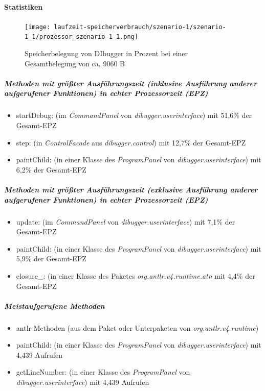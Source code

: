 \documentclass[parskip=full]{scrartcl}
\begin{document}
        \paragraph{Statistiken}
        \begin{figure}[!h]
            \centering
            \texttt{[image: laufzeit-speicherverbrauch/szenario-1/szenario-1\_1/prozessor\_szenario-1-1.png]}
            \caption{Speicherbelegung von DIbugger in Prozent bei einer Gesamtbelegung von ca. 9060 B}
        \end{figure}
        \subparagraph{Methoden mit größter Ausführungszeit (inklusive Ausführung anderer aufgerufener Funktionen) in echter Prozessorzeit (EPZ)}
        \begin{itemize}
            \item{startDebug}: (im \textit{CommandPanel} von \textit{dibugger.userinterface}) mit 51,6\% der Gesamt-EPZ
            \item{step}: (in \textit{ControlFacade} aus \textit{dibugger.control}) mit 12,7\% der Gesamt-EPZ
            \item{paintChild}: (in einer Klasse des \textit{ProgramPanel} von \textit{dibugger.userinterface}) mit 6,2\% der Gesamt-EPZ
        \end{itemize}
        \subparagraph{Methoden mit größter Ausführungszeit (exklusive Ausführung anderer aufgerufener Funktionen) in echter Prozessorzeit (EPZ)}
        \begin{itemize}
            \item{update}: (im \textit{CommandPanel} von \textit{dibugger.userinterface}) mit 7,1\% der Gesamt-EPZ 
            \item{paintChild}: (in einer Klasse des \textit{ProgramPanel} von \textit{dibugger.userinterface}) mit 5,9\% der Gesamt-EPZ
            \item{closure\_}: (in einer Klasse des Paketes \textit{org.antlr.v4.runtime.atn} mit 4,4\% der Gesamt-EPZ
        \end{itemize}
        \subparagraph{Meistaufgerufene Methoden}
        \begin{itemize}
            \item{antlr-Methoden} (aus dem Paket oder Unterpaketen von \textit{org.antlr.v4.runtime}) 
            \item{paintChild}: (in einer Klasse des \textit{ProgramPanel} von \textit{dibugger.userinterface}) mit 4,439 Aufrufen
            \item{getLineNumber}: (in einer Klasse des \textit{ProgramPanel} von \textit{dibugger.userinterface}) mit 4,439 Aufrufen
        \end{itemize}
\end{document}
